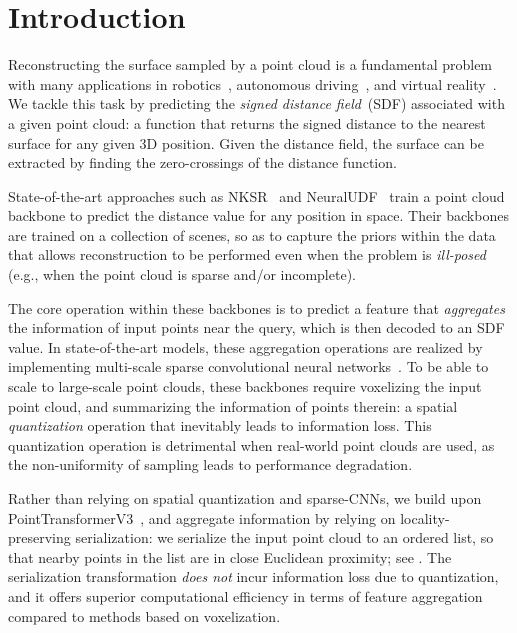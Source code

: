 \section{Introduction}
\label{sec:intro}

Reconstructing the surface sampled by a point cloud is a fundamental problem with many applications in robotics~\cite{tong2023scene}, autonomous driving~\cite{Autodriving}, and virtual reality~\cite{zhuang2024survey,guo2024fast}.
We tackle this task by predicting the \textit{signed distance field}~(SDF) associated with a given point cloud: a function that returns the signed distance to the nearest surface for any given 3D position.
Given the distance field, the surface can be extracted by finding the zero-crossings of the distance function.

State-of-the-art approaches such as NKSR~\cite{huang2023neural} and NeuralUDF~\cite{neuraludf} train a point cloud backbone to predict the distance value for any position in space.
Their backbones are trained on a collection of scenes, so as to capture the priors within the data that allows reconstruction to be performed even when the problem is \textit{ill-posed} (e.g., when the point cloud is sparse and/or incomplete).




The core operation within these backbones is to predict a feature that \textit{aggregates} the information of input points near the query, which is then decoded to an SDF value.
In state-of-the-art models, these aggregation operations are realized by implementing multi-scale sparse convolutional neural networks~\cite{wang2023octformer,choy20194d}.
To be able to scale to large-scale point clouds, these backbones require voxelizing the input point cloud, and summarizing the information of points therein: a spatial \textit{quantization} operation that inevitably leads to information loss.
This quantization operation is detrimental when real-world point clouds are used, as the non-uniformity of sampling leads to performance degradation.


Rather than relying on spatial quantization and sparse-CNNs, we build upon PointTransformerV3~\cite{wu2024point}, and aggregate information by relying on locality-preserving serialization: we serialize the input point cloud to an ordered list, so that nearby points in the list are in close Euclidean proximity; see .
The serialization transformation \textit{does not} incur information loss due to quantization, and it offers superior computational efficiency in terms of feature aggregation compared to methods based on voxelization.

